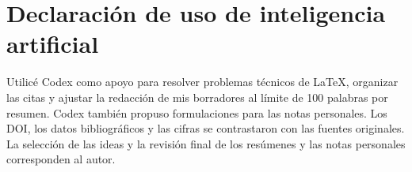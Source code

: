 \documentclass[12pt,a4paper]{article}
\begin{document}
\printbibliography[title={Referencias}]

\section*{Declaración de uso de inteligencia artificial}
Utilicé Codex como apoyo para resolver problemas técnicos de LaTeX, organizar las citas y ajustar la redacción de mis borradores al límite de 100 palabras por resumen. Codex también propuso formulaciones para las notas personales. Los DOI, los datos bibliográficos y las cifras se contrastaron con las fuentes originales. La selección de las ideas y la revisión final de los resúmenes y las notas personales corresponden al autor.
\end{document}
